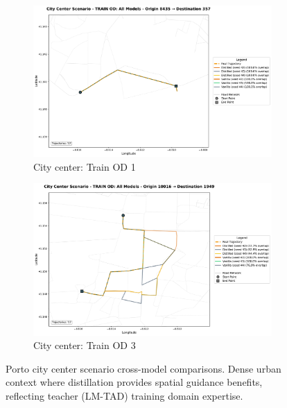 \begin{figure}[H]
\begin{subfigure}{0.49\linewidth}
        \includegraphics[width=\linewidth]{assets/plots/eval/porto/scenario_cross_model/train/city_center/train_od_comparison_1_origin8435_dest357.pdf}
        \caption{City center: Train OD 1}
    \end{subfigure}
    \begin{subfigure}{0.49\linewidth}
        \centering
        \includegraphics[width=\linewidth]{assets/plots/eval/porto/scenario_cross_model/train/city_center/train_od_comparison_3_origin10016_dest1949.pdf}
        \caption{City center: Train OD 3}
    \end{subfigure}
    \caption{Porto city center scenario cross-model comparisons. Dense urban context where distillation provides spatial guidance benefits, reflecting teacher (LM-TAD) training domain expertise.}
    \label{fig:appendix-porto-scenario-city-center}
\end{figure}

